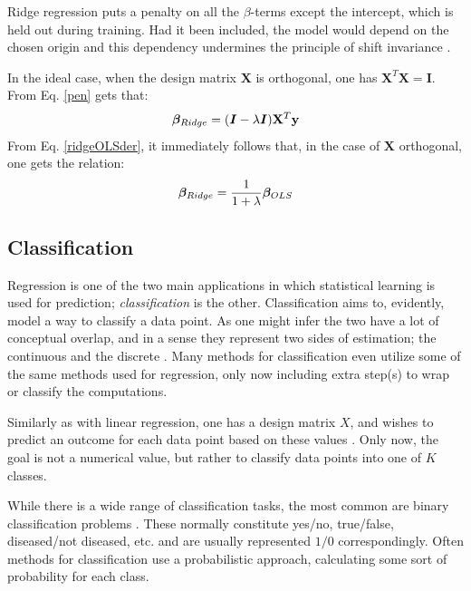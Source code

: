 Ridge regression puts a penalty on all the $\beta$-terms except the intercept, which is held out during training. Had it been included, the model would depend on the chosen origin and this dependency undermines the principle of shift invariance \citep[p. 63]{hastie}.

In the ideal case, when the design matrix $\mathbf{X}$ is orthogonal, one has $\mathbf{X}^T\mathbf{X} = \boldsymbol{I}$. From Eq. \ref{pen} gets that:
\begin{equation}\label{ridgeOLSder}
    \boldsymbol{\beta}_{Ridge} = (\boldsymbol{I} - \lambda\boldsymbol{I}) \mathbf{X}^T \mathbf{y}
\end{equation}
From Eq. \ref{ridgeOLSder}, it immediately follows that, in the case of $\mathbf{X}$ orthogonal, one gets the relation:
\begin{equation}\label{ridgeOLS}
    \boldsymbol{\beta}_{Ridge} = \frac{1}{1+\lambda}\boldsymbol{\beta}_{OLS}
\end{equation}

\subsection{Classification}
Regression is one of the two main applications in which statistical learning is used for prediction; \textit{classification} is the other. Classification aims to, evidently, model a way to classify a data point. As one might infer the two have a lot of conceptual overlap, and in a sense they represent two sides of estimation; the continuous and the discrete \cite[p. 10]{hastie}. 
Many methods for classification even utilize some of the same methods used for regression, only now including extra step(s) to wrap or classify the computations.

Similarly as with linear regression, one has a design matrix $X$, and wishes to predict an outcome for each data point based on these values \cite[Logistic Regression]{morten}. Only now, the goal is not a numerical value, but rather to classify data points into one of $K$ classes. 

While there is a wide range of classification tasks, the most common are binary classification problems \citep[p.121]{hastie}. These normally constitute yes/no, true/false, diseased/not diseased, etc. and are usually represented $1/0$ correspondingly. Often methods for classification use a probabilistic approach, calculating some sort of probability for each class. 

